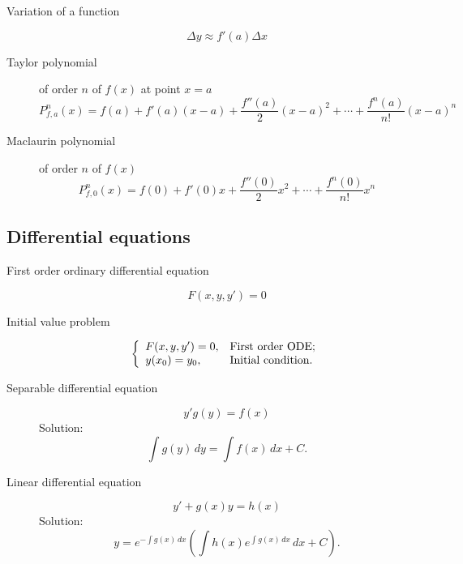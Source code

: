 \begin{multicols}{2}
	\begin{tcolorbox}[hbox, title=Function approximation]
		\begin{minipage}{0.4\textwidth}
			\flushleft
			\begin{description}
				\item[Variation of a function]
				\[
				  \Delta y\approx f'(a)\Delta x
				\]
				\item[Taylor polynomial] of order $n$ of $f(x)$ at point $x=a$
				\[
					P^n_{f,a}(x)=f(a)+f'(a)(x-a)+\frac{f''(a)}{2}(x-a)^2+\cdots+\frac{f^n(a)}{n!}(x-a)^n
				\]
				\item[Maclaurin polynomial] of order $n$ of $f(x)$
				\[
					P^n_{f,0}(x)=f(0)+f'(0)x+\frac{f''(0)}{2}x^2+\cdots+\frac{f^n(0)}{n!}x^n
				\]
			\end{description}
		\end{minipage}
	\end{tcolorbox}



\subsection*{Differential equations}

	\begin{tcolorbox}[hbox, title=First order differential equation]
		\begin{minipage}{0.4\textwidth}
			\flushleft
			\begin{description}
				\item[First order ordinary differential equation] 				      
				\[
					F(x,y,y')=0
				\]
				\item[Initial value problem]
				\[
					\left\{
					\begin{array}{ll}
						F(x,y,y')=0, & \hbox{First order ODE;} \\
						y(x_0)=y_0, & \hbox{Initial condition.} \\
					\end{array}
					\right.    
				\]
			\end{description}
		\end{minipage}
	\end{tcolorbox}

	\begin{tcolorbox}[hbox, title=Solving first order ODE]
		\begin{minipage}{0.4\textwidth}
			\flushleft
			\begin{description}
				\item[Separable differential equation] 
			  \[
			    y'g(y)=f(x)
				\]
				Solution:
				\[
					\int g(y)\,dy = \int f(x)\,dx+C.
				\]
				\item[Linear differential equation] 
			  \[
					y'+g(x)y = h(x)
				\]
				Solution:
				\[
					y=e^{-\int g(x)\,dx}\left(\int h(x)e^{\int g(x)\,dx}\,dx+C\right).
				\]
			\end{description}
		\end{minipage}
	\end{tcolorbox}




\end{multicols}
